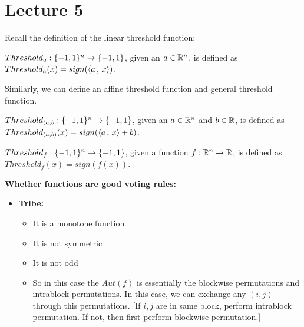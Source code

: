 \chapter{Lecture 5}


Recall the definition of the linear threshold function:

\begin{definition}
    ${Threshold_a} : {\{-1,1\}^n} \rightarrow {\{-1,1\}}$, given an $a \in \mathbb{R}^n$, is defined as $Threshold_a(x) = sign(\left\langle {a} \,,\, {x} \right\rangle)$.
\end{definition}

Similarly, we can define an affine threshold function and general threshold function.

\begin{definition}
    ${Threshold_{(a,b}} : {\{-1,1\}^n} \rightarrow {\{-1,1\}}$, given an $a \in \mathbb{R}^n$ and $b \in \mathbb{R}$, is defined as $Threshold_{(a,b)}(x) = sign(\left\langle {a} \,,\, {x} \right\rangle+b)$.
\end{definition}

\begin{definition}
    ${Threshold_{f}} : {\{-1,1\}^n} \rightarrow {\{-1,1\}}$, given a function ${f} : {\mathbb{R}^n} \rightarrow {\mathbb{R}}$, is defined as $Threshold_f(x) = sign(f(x))$.
\end{definition}


\begin{question}
    
\end{question}

\textbf{Whether functions are good voting rules: }

\begin{itemize}
    \item \textbf{Tribe:}
        \begin{itemize}
            \item It is a monotone function
            \item It is not symmetric
            \item It is not odd 
            \item So in this case the $Aut(f)$ is essentially the blockwise permutations and intrablock permutations. In this case, we can exchange any $(i,j)$ through this permutations. [If $i,j$ are in same block, perform intrablock permutation. If not, then first perform blockwise permutation.]
        \end{itemize}
\end{itemize}

